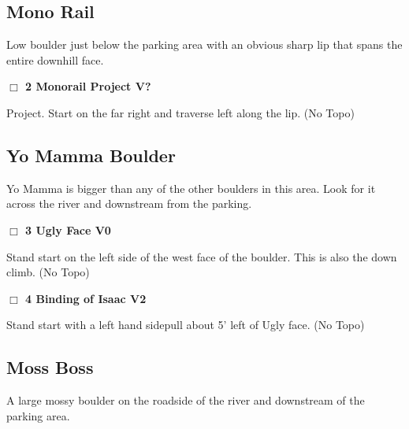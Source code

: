 \begin{multicols}{2}
\needspace{3em}
\subsection*{Mono Rail}\label{bf:Mono Rail}
Low boulder just below the parking area with an obvious sharp lip that spans the entire downhill face.\\



\needspace{2em}
\label{rt:Monorail Project}
\colorbox{black!20}{
\parbox{0.95\linewidth}{
\hspace{-1ex}\textbf{$\Box$
2 Monorail Project V?  
}}}
\begin{adjustwidth}{1.3em}{}			
Project. Start on the far right and traverse left along the lip.
  (No Topo)
\end{adjustwidth}





\needspace{3em}
\subsection*{Yo Mamma Boulder}\label{bf:Yo Mamma Boulder}
Yo Mamma is bigger than any of the other boulders in this area. Look for it across the river and downstream from the parking.\\



\needspace{2em}
\label{rt:Ugly Face}
\colorbox{green!20}{
\parbox{0.95\linewidth}{
\hspace{-1ex}\textbf{$\Box$
3 Ugly Face V0  \warn
}}}
\begin{adjustwidth}{1.3em}{}			
Stand start on the left side of the west face of the boulder. This is also the down climb.
  (No Topo)
\end{adjustwidth}




\needspace{2em}
\label{rt:Binding of Isaac}
\colorbox{green!20}{
\parbox{0.95\linewidth}{
\hspace{-1ex}\textbf{$\Box$
4 Binding of Isaac V2  \warn
}}}
\begin{adjustwidth}{1.3em}{}			
Stand start with a left hand sidepull about 5' left of Ugly face.
  (No Topo)
\end{adjustwidth}





\needspace{3em}
\subsection*{Moss Boss}\label{bf:Moss Boss}
A large mossy boulder on the roadside of the river and downstream of the parking area.\\




\end{multicols}
